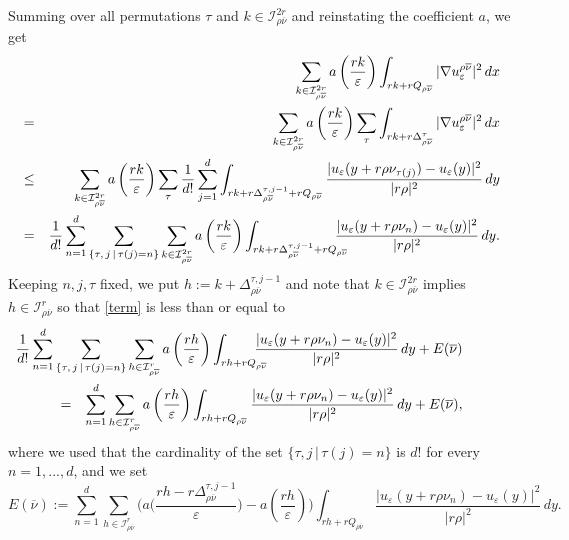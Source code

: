 \documentclass[11pt,a4paper,reqno]{amsart}
\theoremstyle{plain}
\theoremstyle{definition}
\newcommand\e{\varepsilon}
\theoremstyle{remark}
\begin{document}
Summing over all permutations $\tau$ and $k\in \mathcal{I}^{2r}_{\rho\overline{\nu}}$ and reinstating the coefficient $a$, we get
\begin{eqnarray} \label{liminf3} && \nonumber 
\hskip-1.8cm \sum_{k\in \mathcal{I}^{2r}_{{\rho\overline{\nu}}}} a\left(\frac{rk}{\e}\right) \int_{rk+rQ_{\rho\overline{\nu}}} |\nabla u_\e^{\rho\overline{\nu}}|^2\,dx   
\\ \nonumber
&=& \sum_{k\in \mathcal{I}^{2r}_{{\rho\overline{\nu}}}} a\left(\frac{rk}{\e}\right)\sum_\tau \int_{rk+r\Delta_{\rho\overline{\nu}}^\tau} |\nabla u_\e^{\rho\overline{\nu}}|^2\,dx \\ \nonumber
    &\leq& \sum_{k\in \mathcal{I}^{2r}_{{\rho\overline{\nu}}}} a\left(\frac{rk}{\e}\right)\sum_\tau \frac{1}{d!} \sum_{j=1}^d \int_{rk+r\Delta_{\rho\overline{\nu}}^{\tau,j-1}+rQ_{\rho\overline{\nu}}} \frac{|u_\e(y+r\rho\nu_{\tau(j)})-u_\e(y)|^2}{|r\rho|^2}\, dy \\ \label{term}
    &=& \frac{1}{d!} \sum_{n=1}^d \sum_{\{\tau,\,j \,| \, \tau(j)=n\}} \sum_{k\in \mathcal{I}^{2r}_{{\rho\overline{\nu}}}} a\left(\frac{rk}{\e}\right) \int_{rk+r\Delta_{\rho\overline{\nu}}^{\tau,j-1}+rQ_{\rho\overline{\nu}}} \hspace{-0.4 cm} \frac{|u_\e(y+r\rho\nu_n)-u_\e(y)|^2}{|r\rho|^2}\, dy. 
\end{eqnarray}
Keeping $n,j,\tau$ fixed, we put $h:=k+\Delta_{\rho\overline{\nu}}^{\tau,j-1}$ and note that $k\in \mathcal{I}^{2r}_{\rho\overline{\nu}}$ implies $h\in\mathcal{I}^{r}_{\rho\overline{\nu}}$  so that \eqref{term} is less than or equal to
\begin{eqnarray*} && \nonumber
    \hskip-2.5cm \frac{1}{d!} \sum_{n=1}^d \sum_{\{\tau,\,j \,| \, \tau(j)=n\}}\sum_{h\in \mathcal{I}^r_{{\rho\overline{\nu}}}} a\left(\frac{rh}{\e}\right)  \int_{rh+rQ_{\rho\overline{\nu}}} \hspace{-0.4 cm} \frac{|u_\e(y+r\rho\nu_n)-u_\e(y)|^2}{|r\rho|^2}\, dy + E(\overline{\nu}) \\ \label{term1}
    &=& \sum_{n=1}^d \sum_{h\in \mathcal{I}^r_{{\rho\overline{\nu}}}} a\left(\frac{rh}{\e}\right) \int_{rh+rQ_{\rho\overline{\nu}}} \frac{|u_\e(y+r\rho\nu_n)-u_\e(y)|^2}{|r\rho|^2}\, dy + E(\overline{\nu}),
\end{eqnarray*}
where we used that the cardinality of the set  $\{\tau, j\, |\, \tau(j)=n\}$ is $d!$ for every $n=1,...,d$, and we set
\begin{equation*}
E(\overline{\nu}):= \sum_{n=1}^d \sum_{h\in \mathcal{I}^{r}_{{\rho\overline{\nu}}}} \biggl(a\biggl(\frac{rh-r\Delta_{\rho\overline{\nu}}^{\tau,j-1}}{\e}\biggr)-a\left(\frac{rh}{\e}\right)\biggr) \int_{rh+rQ_{\rho\overline{\nu}}} \frac{|u_\e(y+r\rho\nu_n)-u_\e(y)|^2}{|r\rho|^2}\, dy.
\end{equation*}
\end{document}
